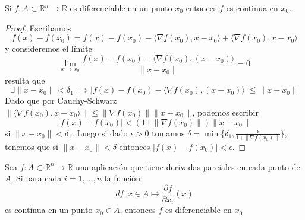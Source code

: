 \begin{teorema}
    Si $f: A \subset \mathbb{R}^n \to \mathbb{R}$ es diferenciable en un punto $x_0$ entonces $f$ es continua en $x_0$.
\end{teorema}

\begin{proof}
    Escribamos 
    $$f(x) - f(x_0) = f(x) - f(x_0) - \langle \nabla f(x_0), x - x_0\rangle + \langle \nabla f(x_0), x - x_0\rangle$$
    y consideremos el límite
    $$ \lim_{x \to x_0} \frac{f(x) - f(x_0) - \langle \nabla f(x_0), (x - x_0) \rangle}{\|x - x_0\|}  = 0 $$
    resulta que 
    $$ \exists \|x - x_0\| < \delta_1 \implies \left| f(x) - f(x_0) - \langle \nabla f(x_0), (x - x_0) \rangle \right| \leq \|x - x_0\|$$
    Dado que por Cauchy-Schwarz $\|\langle \nabla f(x_0), x - x_0 \rangle \| \leq \|\nabla f(x_0)\| \|x - x_0\|$, podemos escribir
    $$ |f(x) - f(x_0)| < (1 + \|\nabla f(x_0)\|) \|x - x_0\| $$
    si $\|x - x_0\| < \delta_1$. Luego si dado $\epsilon > 0$ tomamos $\delta = \min\{\delta_1, \frac{\epsilon}{1 + \|\nabla f(x_0)\|}\}$, tenemos que si $\|x - x_0\| < \delta$ entonces $|f(x) - f(x_0)| < \epsilon$.
\end{proof}

\begin{teorema}
    Sea $f:A \subset \mathbb{R}^n \to \mathbb{R}$ una aplicación que tiene derivadas parciales en cada punto de $A$. Si para cada $i = 1, \ldots, n$ la función
    $$df: x \in A \mapsto \frac{\partial f}{\partial x_i}(x)$$
    es continua en un punto $x_0 \in A$, entonces $f$ es diferenciable en $x_0$ 
\end{teorema}

